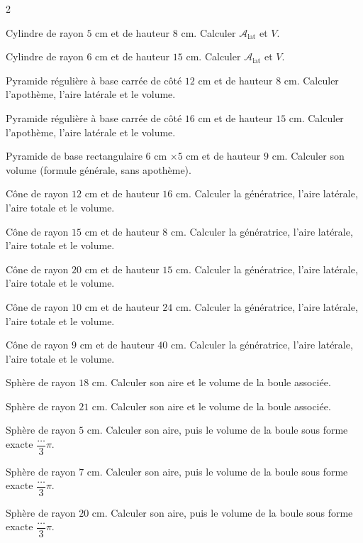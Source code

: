 \begin{multicols}{2}

\exo{} Cylindre de rayon $5$ cm et de hauteur $8$ cm. Calculer $\mathcal{A}_{\text{lat}}$
et $V$.

\exo{} Cylindre de rayon $6$ cm et de hauteur $15$ cm. Calculer $\mathcal{A}_{\text{lat}}$
et $V$.

\exo{} Pyramide régulière à base carrée de côté $12$ cm et de hauteur $8$ cm.
Calculer l'apothème, l'aire latérale et le volume.

\exo{} Pyramide régulière à base carrée de côté $16$ cm et de hauteur $15$ cm.
Calculer l'apothème, l'aire latérale et le volume.

\exo{} Pyramide de base rectangulaire $6$ cm $\times5$ cm et de hauteur $9$ cm.
Calculer son volume (formule générale, sans apothème).

\exo{} Cône de rayon $12$ cm et de hauteur $16$ cm. Calculer la génératrice, l'aire
latérale, l'aire totale et le volume.

\exo{} Cône de rayon $15$ cm et de hauteur $8$ cm. Calculer la génératrice, l'aire
latérale, l'aire totale et le volume.

\exo{} Cône de rayon $20$ cm et de hauteur $15$ cm. Calculer la génératrice, l'aire
latérale, l'aire totale et le volume.

\exo{} Cône de rayon $10$ cm et de hauteur $24$ cm. Calculer la génératrice, l'aire
latérale, l'aire totale et le volume.

\exo{} Cône de rayon $9$ cm et de hauteur $40$ cm. Calculer la génératrice, l'aire
latérale, l'aire totale et le volume.

\exo{} Sphère de rayon $18$ cm. Calculer son aire et le volume de la boule associée.

\exo{} Sphère de rayon $21$ cm. Calculer son aire et le volume de la boule associée.

\exo{} Sphère de rayon $5$ cm. Calculer son aire, puis le volume de la boule sous
forme exacte $\dfrac{\ldots}{3}\pi$.

\exo{} Sphère de rayon $7$ cm. Calculer son aire, puis le volume de la boule sous
forme exacte $\dfrac{\ldots}{3}\pi$.

\exo{} Sphère de rayon $20$ cm. Calculer son aire, puis le volume de la boule sous
forme exacte $\dfrac{\ldots}{3}\pi$.


\end{multicols}
